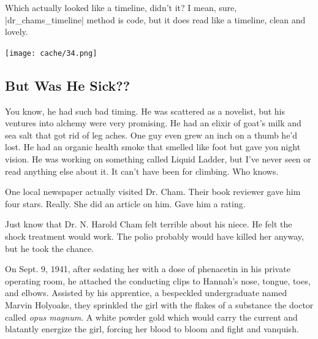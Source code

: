 \documentclass[12pt,twoside]{report}
\begin{document}
Which actually looked like a timeline, didn't it?  I mean, sure,
\rubyinline|dr_chams_timeline| method is code, but it
does read like a timeline, clean and lovely.

\newpage

	\texttt{[image: cache/34.png]}


\subsection{But Was He Sick??}

You know, he had such bad timing.  He was scattered as a novelist, but
his ventures into alchemy were very promising.  He had an elixir of
goat's milk and sea salt that got rid of leg aches. One guy even grew
an inch on a thumb he'd lost.  He had an organic health smoke that
smelled like foot but gave you night vision.  He was working on
something called Liquid Ladder, but I've never seen or read anything
else about it.  It can't have been for climbing.  Who knows.

One local newspaper actually visited Dr. Cham.  Their book reviewer
gave him four stars. Really.  She did an article on him.  Gave him a
rating.

Just know that Dr. N. Harold Cham felt terrible about his niece.  He
felt the shock treatment would work.  The polio probably would have
killed her anyway, but he took the chance.

On Sept. 9, 1941, after sedating her with a dose of phenacetin in his
private operating room, he attached the conducting clips to Hannah's
nose, tongue, toes, and elbows.  Assisted by his apprentice, a
bespeckled undergraduate named Marvin Holyoake, they sprinkled the
girl with the flakes of a substance the doctor called {\em opus
  magnum}.  A white powder gold which would carry the current and
blatantly energize the girl, forcing her blood to bloom and fight and
vanquish.
\end{document}
